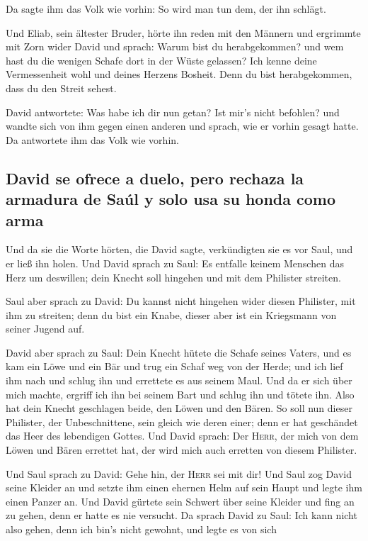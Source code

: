  Da sagte ihm das Volk wie vorhin: So wird man tun dem,
der ihn schlägt.

 Und Eliab, sein ältester Bruder, hörte ihn reden mit den
Männern und ergrimmte mit Zorn wider David und sprach: Warum bist du
herabgekommen? und wem hast du die wenigen Schafe dort in der Wüste
gelassen? Ich kenne deine Vermessenheit wohl und deines Herzens Bosheit.
Denn du bist herabgekommen, dass du den Streit sehest.

 David antwortete: Was habe ich dir nun getan? Ist mir's
nicht befohlen?  und wandte sich von ihm gegen einen
anderen und sprach, wie er vorhin gesagt hatte. Da antwortete ihm das
Volk wie vorhin.

\hypertarget{david-se-ofrece-a-duelo-pero-rechaza-la-armadura-de-sauxfal-y-solo-usa-su-honda-como-arma}{%
\subsection{David se ofrece a duelo, pero rechaza la armadura de Saúl y
solo usa su honda como
arma}\label{david-se-ofrece-a-duelo-pero-rechaza-la-armadura-de-sauxfal-y-solo-usa-su-honda-como-arma}}

 Und da sie die Worte hörten, die David sagte,
verkündigten sie es vor Saul, und er ließ ihn holen.  Und
David sprach zu Saul: Es entfalle keinem Menschen das Herz um deswillen;
dein Knecht soll hingehen und mit dem Philister streiten.

 Saul aber sprach zu David: Du kannst nicht hingehen
wider diesen Philister, mit ihm zu streiten; denn du bist ein Knabe,
dieser aber ist ein Kriegsmann von seiner Jugend auf.

 David aber sprach zu Saul: Dein Knecht hütete die Schafe
seines Vaters, und es kam ein Löwe und ein Bär und trug ein Schaf weg
von der Herde;  und ich lief ihm nach und schlug ihn und
errettete es aus seinem Maul. Und da er sich über mich machte, ergriff
ich ihn bei seinem Bart und schlug ihn und tötete ihn. 
Also hat dein Knecht geschlagen beide, den Löwen und den Bären. So soll
nun dieser Philister, der Unbeschnittene, sein gleich wie deren einer;
denn er hat geschändet das Heer des lebendigen Gottes. 
Und David sprach: Der \textsc{Herr}, der mich von dem Löwen und Bären
errettet hat, der wird mich auch erretten von diesem Philister.

 Und Saul sprach zu David: Gehe hin, der \textsc{Herr}
sei mit dir! Und Saul zog David seine Kleider an und setzte ihm einen
ehernen Helm auf sein Haupt und legte ihm einen Panzer an.
 Und David gürtete sein Schwert über seine Kleider und
fing an zu gehen, denn er hatte es nie versucht. Da sprach David zu
Saul: Ich kann nicht also gehen, denn ich bin's nicht gewohnt, und legte
es von sich

